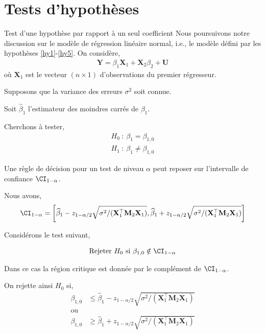 \section{Tests d'hypothèses}
\frame{\sectionpage}
\begin{frame}[allowframebreaks]{Test d'une hypothèse par rapport à un seul coefficient}
Nous poursuivons notre discussion sur le modèle de régression linéaire normal, i.e., le modèle défini par  les hypothèses \ref{hy1}-\ref{hy5}.
On considère,
\begin{align*}
\mathbf{Y} = \beta_1\mathbf{X}_1 + \mathbf{X}_2\beta_2 + \mathbf{U}
\end{align*}
où $\mathbf{X}_1$ est le vecteur $(n\times 1)$ d'observations du premier régresseur. 

\medskip

Supposons que la variance des erreurs $\sigma^2$ soit connue. 

\medskip

Soit $\widehat{\beta}_1$ l'estimateur des moindres carrés de $\beta_1$.  

\medskip

Cherchons à tester,
\begin{align}
H_0 \ : \  \beta_1 = \beta_{1, 0}\nonumber\\
H_1 \ : \  \beta_1 \neq \beta_{1, 0}
\label{eq34}
\end{align}

\medskip

Une règle de décision pour un test de niveau $\alpha$ peut reposer  sur l'intervalle de confiance $\CI_{1-\alpha}$. 

\medskip

Nous avons,
\begin{align*}
\CI_{1-\alpha} = \left[ \widehat{\beta}_1 - z_{1 - \alpha/2}\sqrt{\sigma^2/(\mathbf{X}_1^\top\mathbf{M}_2\mathbf{X}_1)},  \widehat{\beta}_1 + z_{1 - \alpha/2}\sqrt{\sigma^2/(\mathbf{X}_1^\top\mathbf{M}_2\mathbf{X}_1)}\right]
\end{align*}

Considérons le test suivant,

\begin{align*}
\textrm{Rejeter} \ H_0 \  \textrm{si} \ \beta_{1,0} \notin \CI_{1-\alpha}
\end{align*}

Dans ce cas la région critique est donnée par le complément de $ \CI_{1-\alpha}$. 

\medskip

On rejette ainsi $H_0$ si,
\begin{align*}
\beta_{1,0}&\leq  \widehat{\beta}_1 - z_{1 - \alpha/2}\sqrt{\sigma^2/(\mathbf{X}_1^\top\mathbf{M}_2\mathbf{X}_1)}\\
\textrm{ou}&\\
\beta_{1,0}&\geq  \widehat{\beta}_1 + z_{1 - \alpha/2}\sqrt{\sigma^2/(\mathbf{X}_1^\top\mathbf{M}_2\mathbf{X}_1)}
\end{align*}


\end{frame}
